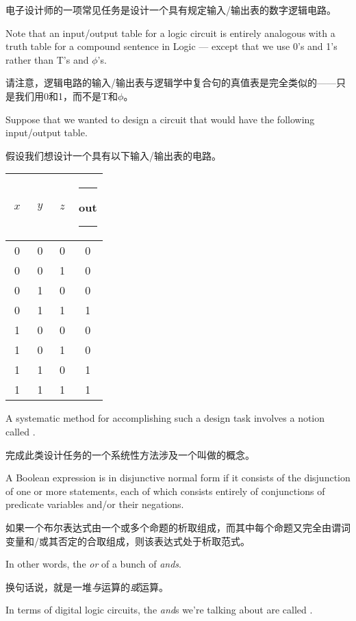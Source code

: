 电子设计师的一项常见任务是设计一个具有规定输入/输出表的数字逻辑电路。

Note that an input/output table for a logic circuit is entirely
analogous with a truth table for a compound sentence in Logic ---
except that we use 0's and 1's rather than T's and $\phi$'s.

请注意，逻辑电路的输入/输出表与逻辑学中复合句的真值表是完全类似的——只是我们用0和1，而不是T和$\phi$。

Suppose that we wanted to design a circuit that would
have the following input/output table.

假设我们想设计一个具有以下输入/输出表的电路。

\begin{center}
\begin{tabular}{c|c|c|c}
$\; x \;$ & $\; y \;$ & $\; z \;$ & \rule{5pt}{0pt} out \rule{5pt}{0pt} \\ \hline
0 & 0 & 0 & 0 \\
0 & 0 & 1 & 0 \\
0 & 1 & 0 & 0 \\
0 & 1 & 1 & 1 \\ \hline
1 & 0 & 0 & 0 \\ 
1 & 0 & 1 & 0 \\ 
1 & 1 & 0 & 1 \\ 
1 & 1 & 1 & 1 \\
\end{tabular}
\end{center}

A systematic method for accomplishing such a design task involves
a notion called .

完成此类设计任务的一个系统性方法涉及一个叫做的概念。

A Boolean expression
is in disjunctive normal form if it consists of the disjunction of 
one or more statements, each of which consists entirely of conjunctions
of predicate variables and/or their negations.

如果一个布尔表达式由一个或多个命题的析取组成，而其中每个命题又完全由谓词变量和/或其否定的合取组成，则该表达式处于析取范式。

In other words, the {\em or}
of a bunch of {\em ands}.

换句话说，就是一堆{\em 与}运算的{\em 或}运算。

In terms of digital logic circuits, the {\em and}s 
we're talking about are called .


